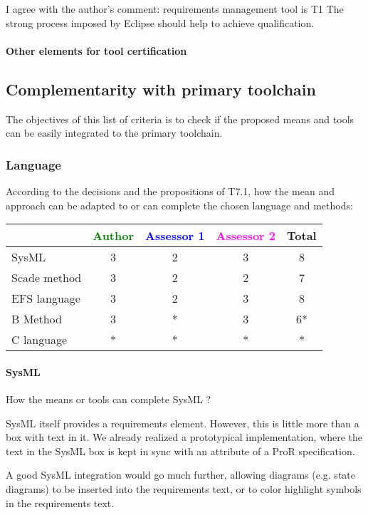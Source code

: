 \begin{assessor2}
I agree with the author's comment: requirements management tool is T1 The strong process imposed by Eclipse should help to achieve qualification.
\end{assessor2}

\paragraph{Other elements for tool certification}


\subsection{Complementarity with primary toolchain}

The objectives of this list of criteria is to check if the proposed means and tools can be easily integrated to the primary toolchain.

\subsubsection{Language}


According to the decisions and the propositions of T7.1, how the mean and approach can be adapted to or can complete the chosen language and methods:

\begin{tabular}{|l | c | c | c | c|}
\hline
& \textcolor{green}{Author} & \textcolor{blue}{Assessor 1} & \textcolor{magenta}{Assessor 2} & Total \\
\hline
SysML  & 3 & 2 & 3 & 8 \\
\hline
Scade method & 3 & 2 & 2 & 7 \\
\hline
EFS language & 3 & 2 & 3 & 8 \\
\hline
B Method & 3 & * & 3 & 6* \\
\hline
C language & * & * & * & * \\
\hline
\end{tabular}

\paragraph{SysML}
How the means or tools can complete SysML ?

\begin{author_comment}
SysML itself provides a requirements element.  However, this is little more than a box with text in it.  We already realized a prototypical implementation, where the text in the SysML box is kept in sync with an attribute of a ProR specification.

A good SysML integration would go much further, allowing diagrams (e.g. state diagrams) to be inserted into the requirements text, or to color highlight symbols in the requirements text.
\end{author_comment}

